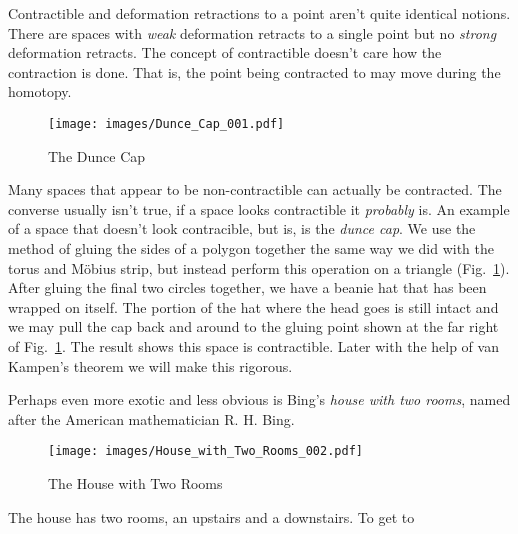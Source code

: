 \documentclass{book}                                                           %
\begin{document}
                Contractible and deformation retractions to a point aren't quite
                identical notions. There are spaces with \textit{weak}
                deformation retracts to a single point but no \textit{strong}
                deformation retracts. The concept of contractible doesn't care
                how the contraction is done. That is, the point being contracted
                to may move during the homotopy.
                \begin{figure}[H]
                    \centering
                    \captionsetup{type=figure}
                    \texttt{[image: images/Dunce\_Cap\_001.pdf]}
                    \caption{The Dunce Cap}
                    \label{fig:Dunce_Cap_001}
                \end{figure}
                Many spaces that appear to be non-contractible can actually be
                contracted. The converse usually isn't true, if a space looks
                contractible it \textit{probably} is. An example of a space that
                doesn't look contracible, but is, is the \textit{dunce cap}. We
                use the method of gluing the sides of a polygon together the
                same way we did with the torus and M\"{o}bius strip, but instead
                perform this operation on a triangle
                (Fig.~\ref{fig:Dunce_Cap_001}). After gluing the final two
                circles together, we have a beanie hat that has been wrapped
                on itself. The portion of the hat where the head goes is still
                intact and we may pull the cap back and around to the gluing
                point shown at the far right of Fig.~\ref{fig:Dunce_Cap_001}.
                The result shows this space is contractible. Later with the
                help of van Kampen's theorem we will make this rigorous.
                \par\hfill\par
                Perhaps even more exotic and less obvious is Bing's
                \textit{house with two rooms}, named after the American
                mathematician R. H. Bing.
                \begin{figure}[H]
                    \centering
                    \captionsetup{type=figure}
                    \texttt{[image: images/House\_with\_Two\_Rooms\_002.pdf]}
                    \caption{The House with Two Rooms}
                    \label{fig:House_with_Two_Rooms_002}
                \end{figure}
                The house has two rooms, an upstairs and a downstairs. To get to
\end{document}
